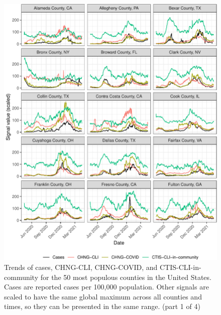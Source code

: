 \documentclass[9pt,twoside,lineno]{pnas-new}
\begin{document}
\begin{figure}

{\centering \includegraphics[width=\textwidth]{fig/county-trend-grids-1-1} 

}

\caption{Trends of cases, CHNG-CLI, CHNG-COVID, and CTIS-CLI-in-community for the 50 most populous counties in the United States. Cases are reported cases per 100,000 population. Other signals are scaled to have the same global maximum across all counties and times, so they can be presented in the same range. (part 1 of 4)}\label{fig:county-trend-grids-1}
\end{figure}

\clearpage
\end{document}
